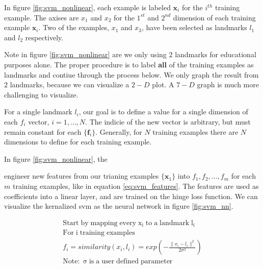 \message{ !name(main.tex)}\documentclass[11pt]{article}
\begin{document}
In figure \ref{fig:svm_nonlinear}, each example is labeled $\mathbf{x}_{i}$ for the $i^{th}$ training example. The axises are $x_{1}$ and $x_{2}$ for the $1^{st}$ and $2^{nd}$ dimension of each training example $\mathbf{x}_{i}$. Two of the examples, $x_{1}$ and $x_{3}$, have been selected as landmarks $l_{1}$ and $l_{2}$ respectively. 

Note in figure \ref{fig:svm_nonlinear} are we only using $2$ landmarks for educational purposes alone. The proper procedure is to label \textbf{all} of the training examples as landmarks and contiue through the process below. We only graph the result from $2$ landmarks, because we can visualize a $2-D$ plot. A $7-D$ graph is much more challenging to visualize.

For a single landmark  $l_{i}$, our goal is to define a value for a single dimension of each $f_{i}$ vector, $i = 1,\ldots,N$. The indicie of the new vector is arbitrary, but must remain constant for each $\{\mathbf{f}_{i}\}$. Generally, for $N$ training examples there are $N$ dimensions to define for each training example. 

In figure \ref{fig:svm_nonlinear}, the 

engineer new features from our trianing examples $\{\mathbf{x}_{1}\}$ into $f_{1},f_{2},\ldots,f_{m}$ for each $m$ training examples, like in equation \ref{eq:svm_features}. The features are used as coefficients into a linear layer, and are trained on the hinge loss function. We can visualize the kernalized svm as the neural network in figure \ref{fig:svm_nn}.

\begin{gather}
  \mathrm{Start\;by\;mapping\;every\;x_{i}\;to\;a\;landmark\;l_{i}}\nonumber\\
  \mathrm{For\;i\;training\;examples}\nonumber\\
  f_{i} = similarity(x_{i},l_{i}) = exp(- \frac{\|x_{i} -
    l_{i}\|^{2}}{2\sigma ^{2}})\\
  \mathrm{Note:\;\sigma\;is\;a\;user\;defined\;parameter}\nonumber
  \label{eq:svm_features}
\end{gather}
\end{document}
